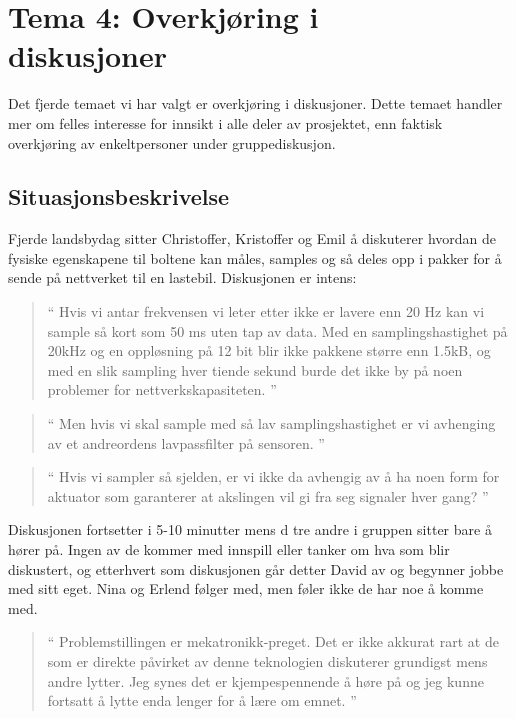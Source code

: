 \chapter{Tema 4: Overkjøring i\\diskusjoner}
Det fjerde temaet vi har valgt er overkjøring i diskusjoner.
Dette temaet handler mer om felles interesse for innsikt i alle deler av
prosjektet, enn faktisk overkjøring av enkeltpersoner under gruppediskusjon.

\section {Situasjonsbeskrivelse}
Fjerde landsbydag sitter Christoffer, Kristoffer og Emil å diskuterer hvordan de fysiske egenskapene til boltene kan måles, samples og så deles opp i pakker for å sende på nettverket til en lastebil. Diskusjonen er intens: 

\begin{quote}``
Hvis vi antar frekvensen vi leter etter ikke er lavere enn 20 Hz kan vi sample så kort som 50 ms uten tap av data. Med en samplingshastighet på 20kHz og en oppløsning på 12 bit blir ikke pakkene større enn 1.5kB, og med en slik sampling hver tiende sekund burde det ikke by på noen problemer for nettverkskapasiteten.
''\end{quote} 

\begin{quote}``
Men hvis vi skal sample med så lav samplingshastighet er vi avhenging av et andreordens lavpassfilter på sensoren.
''\end{quote} 

\begin{quote}``
Hvis vi sampler så sjelden, er vi ikke da avhengig av å ha noen form for aktuator som garanterer at akslingen vil gi fra seg signaler hver gang?
''\end{quote} 

Diskusjonen fortsetter i 5-10 minutter mens d tre andre i gruppen sitter bare å hører på. Ingen av de kommer med innspill eller tanker om hva som blir diskustert, og etterhvert som diskusjonen går detter David av  og begynner jobbe med sitt eget. Nina og Erlend følger med, men føler ikke de har noe å komme med. 

\begin{quote}``
Problemstillingen er mekatronikk-preget. Det er ikke akkurat rart at de som er direkte påvirket av denne teknologien diskuterer grundigst mens andre lytter. Jeg synes det er kjempespennende å høre på og jeg kunne fortsatt å lytte enda lenger for å lære om emnet.
''\end{quote} 

